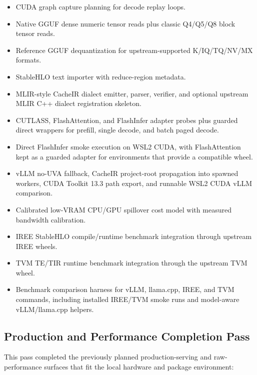 \documentclass[11pt]{article}
\begin{document}
\begin{itemize}[leftmargin=*]
        paged-attention decode.
  \item CUDA graph capture planning for decode replay loops.
  \item Native GGUF dense numeric tensor reads plus classic Q4/Q5/Q8 block
        tensor reads.
  \item Reference GGUF dequantization for upstream-supported K/IQ/TQ/NV/MX formats.
  \item StableHLO text importer with reduce-region metadata.
  \item MLIR-style CacheIR dialect emitter, parser, verifier, and optional
        upstream MLIR C++ dialect registration skeleton.
  \item CUTLASS, FlashAttention, and FlashInfer adapter probes plus guarded
        direct wrappers for prefill, single decode, and batch paged decode.
  \item Direct FlashInfer smoke execution on WSL2 CUDA, with FlashAttention kept
        as a guarded adapter for environments that provide a compatible wheel.
  \item vLLM no-UVA fallback, CacheIR project-root propagation into spawned
        workers, CUDA Toolkit 13.3 path export, and runnable WSL2 CUDA vLLM
        comparison.
  \item Calibrated low-VRAM CPU/GPU spillover cost model with measured bandwidth calibration.
  \item IREE StableHLO compile/runtime benchmark integration through upstream
        IREE wheels.
  \item TVM TE/TIR runtime benchmark integration through the upstream TVM wheel.
  \item Benchmark comparison harness for vLLM, llama.cpp, IREE, and TVM commands,
        including installed IREE/TVM smoke runs and model-aware vLLM/llama.cpp
        helpers.
\end{itemize}

\subsection{Production and Performance Completion Pass}

This pass completed the previously planned production-serving and raw-performance
surfaces that fit the local hardware and package environment:
\end{document}
